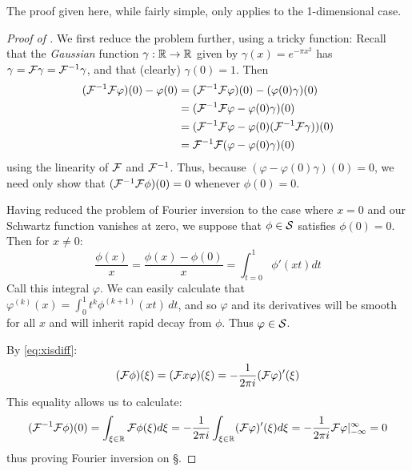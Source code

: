       \begin{rmk}
        The proof given here, while fairly simple, only applies to the 1-dimensional case. 
      \end{rmk}
      \begin{proof}[Proof of ]
        We first reduce the problem further, using a tricky function:
        Recall that the \emph{Gaussian} function $\gamma:\R\rightarrow\R$ given by $\gamma(x) = e^{-\pi x^2}$ has $\gamma=\F\gamma=\F^{-1}\gamma$, and that (clearly) $\gamma(0)=1$.
        Then 
        \begin{align*}
          (\F^{-1}\F\varphi)(0) - \varphi(0) &= (\F^{-1}\F\varphi)(0) - (\varphi(0)\gamma)(0)\\
          &= (\F^{-1}\F\varphi - \varphi(0)\gamma)(0)\\
          &= (\F^{-1}\F\varphi - \varphi(0)(\F^{-1}\F\gamma))(0)\\
          &= \F^{-1}\F(\varphi-\varphi(0)\gamma)(0)
        \end{align*}
        using the linearity of $\F$ and $\F^{-1}$.
        Thus, because $(\varphi-\varphi(0)\gamma)(0)=0$, we need only show that $(\F^{-1}\F\phi)(0) = 0$ whenever $\phi(0)=0$.

        Having reduced the problem of Fourier inversion to the case where $x=0$ and our Schwartz function vanishes at zero, we suppose that $\phi\in\S$ satisfies $\phi(0)=0$. 
        Then for $x\ne0$:
        \begin{equation*}
          \frac{\phi(x)}{x} = \frac{\phi(x)-\phi(0)}{x} = \int_{t=0}^1 \phi'(xt)dt
        \end{equation*}
        Call this integral $\varphi$.
        We can easily calculate that $\varphi^{(k)}(x) = \int_0^1t^k\phi^{(k+1)}(xt)\,dt$, and so $\varphi$ and its derivatives will be smooth for all $x$ and will inherit rapid decay from $\phi$.
        Thus $\varphi\in\S$.

        By \eqref{eq:xisdiff}:
        \begin{equation*}
          (\F\phi)(\xi) = (\F x\varphi)(\xi)= -\frac{1}{2\pi i}(\F\varphi)'(\xi)
        \end{equation*}
        This equality allows us to calculate:
        \begin{equation*}
          (\F^{-1}\F\phi)(0) = \int_{\xi\in\R} \F\phi(\xi)d\xi = -\frac{1}{2\pi i}\int_{\xi\in\R} (\F\varphi)'(\xi)d\xi = -\frac{1}{2\pi i} \F\varphi\vert_{-\infty}^\infty = 0
        \end{equation*}
        thus proving Fourier inversion on \S.
      \end{proof}

